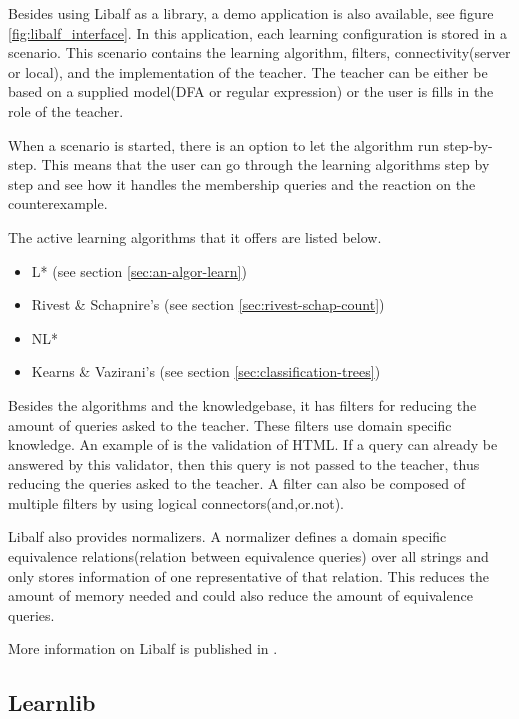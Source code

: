 \documentclass[multi,crop=false,class=article]{standalone}
\begin{document}
Besides using Libalf as a library, a demo application is also available, see 
figure \ref{fig:libalf_interface}. In this application, each learning 
configuration is stored in a scenario. This scenario contains the learning 
algorithm, filters, connectivity(server or local), and the implementation of 
the teacher. The teacher can be either be based on a supplied model(DFA or 
regular expression) or the user is fills in the role of the teacher.

When a scenario is started, there is an option to let the algorithm run 
step-by-step. This means that the user can go through the learning algorithms 
step by step and see how it handles the membership queries and the reaction on 
the counterexample. 

The active learning algorithms that it offers are listed below.

\begin{itemize}
	\item L* (see section \ref{sec:an-algor-learn})
	\item Rivest \& Schapnire's (see section \ref{sec:rivest-schap-count})
	\item NL* \cite{Bollig2009}
	\item Kearns \& Vazirani's (see section \ref{sec:classification-trees})
\end{itemize}

Besides the algorithms and the knowledgebase, it has filters for reducing the 
amount of queries asked to the teacher. These filters use domain specific 
knowledge. An example of is the validation of HTML. If a query can already be 
answered by this validator, then this query is not passed to the teacher, thus 
reducing the queries asked to the teacher.
A filter can also be composed of multiple filters by using logical 
connectors(and,or.not).

Libalf also provides normalizers. A normalizer defines a domain specific 
equivalence relations(relation between equivalence queries) over all strings 
and only stores information of one representative of that relation. This 
reduces the amount of memory needed and could also reduce the amount of 
equivalence queries.

More information on Libalf is published in \cite{Bollig2010}.

\subsection{Learnlib}
\label{ssec:learnlib}
\end{document}
